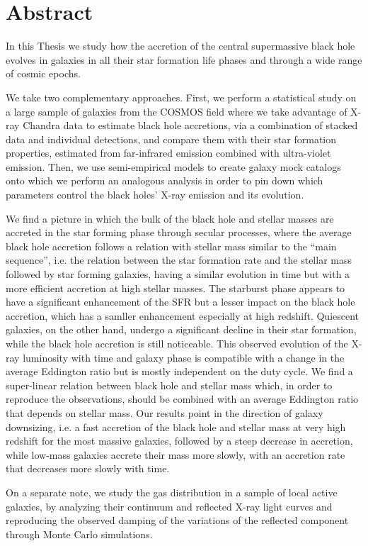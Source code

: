 \chapter*{Abstract}

In this Thesis we study how the accretion of the central supermassive black hole evolves in galaxies in all their star formation life phases and through a wide range of cosmic epochs. 

We take two complementary approaches. First, we perform a statistical study on a large sample of galaxies from the COSMOS field where we take advantage of X-ray Chandra data to estimate black hole accretions, via a combination of stacked data and individual detections, and compare them with their star formation properties, estimated from far-infrared emission combined with ultra-violet emission. Then, we use semi-empirical models to create galaxy mock catalogs onto which we perform an analogous analysis in order to pin down which parameters control the black holes' X-ray emission and its evolution.


We find a picture in which the bulk of the black hole and stellar masses are accreted in the star forming phase through secular processes, where the average black hole accretion follows a relation with stellar mass similar to the ``main sequence'', i.e. the relation between the star formation rate and the stellar mass followed by star forming galaxies, having a similar evolution in time but with a more efficient accretion at high stellar masses.
The starburst phase appears to have a significant enhancement of the SFR but a lesser impact on the black hole accretion, which has a samller enhancement especially at high redshift. 
Quiescent galaxies, on the other hand, undergo a significant decline in their star formation, while the black hole accretion is still noticeable.
This observed evolution of the X-ray luminosity with time and galaxy phase is compatible with a change in the average Eddington ratio but is mostly independent on the duty cycle.
We find a super-linear relation between black hole and stellar mass which, in order to reproduce the observations, should be combined with an average Eddington ratio that depends on stellar mass.
Our results point in the direction of galaxy downsizing, i.e. a fast accretion of the black hole and stellar mass at very high redshift for the most massive galaxies, followed by a steep decrease in accretion, while low-mass galaxies accrete their mass more slowly, with an accretion rate that decreases more slowly with time.

On a separate note, we study the gas distribution in a sample of local active galaxies, by analyzing their continuum and reflected X-ray light curves and reproducing the observed damping of the variations of the reflected component through Monte Carlo simulations.